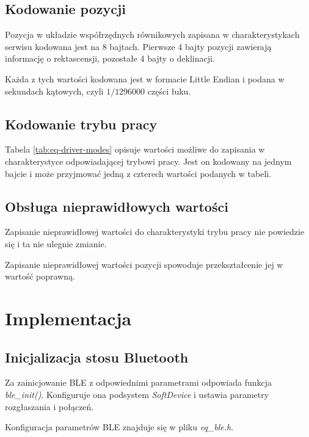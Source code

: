 \subsection{Kodowanie pozycji}

Pozycja w układzie współrzędnych równikowych zapisana w charakterystykach
serwisu kodowana jest na 8 bajtach. Pierwsze 4 bajty pozycji zawierają
informację o rektascensji, pozostałe 4 bajty o deklinacji.

Każda z tych wartości kodowana jest w formacie Little Endian i podana
w sekundach kątowych, czyli $1/1296000$ części łuku.

\subsection{Kodowanie trybu pracy}

Tabela \ref{tab:eq-driver-modes} opisuje wartości możliwe do zapisania
w charakterystyce odpowiadającej trybowi pracy. Jest on kodowany na jednym
bajcie i może przyjmować jedną z czterech wartości podanych w tabeli.

\subsection{Obsługa nieprawidłowych wartości}

Zapisanie nieprawidłowej wartości do charakterystyki trybu pracy nie powiedzie
się i ta nie ulegnie zmianie.

Zapisanie nieprawidłowej wartości pozycji spowoduje przekształcenie jej
w wartość poprawną.

\section{Implementacja}

\subsection{Inicjalizacja stosu Bluetooth}

Za zainicjowanie BLE z odpowiednimi parametrami odpowiada funkcja
\emph{ble\_init()}. Konfiguruje ona podsystem \emph{SoftDevice} i ustawia
parametry rozgłaszania i połączeń.

Konfiguracja parametrów BLE znajduje się w pliku \emph{eq\_ble.h}.

